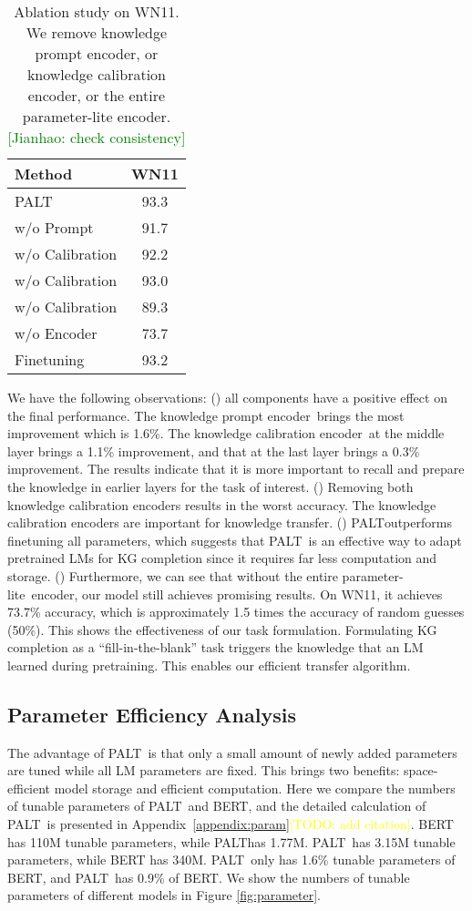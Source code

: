 \documentclass[11pt]{article}
\newcommand{\method}{\textsc{PALT}}
\newcommand{\methodLarge}{\method}
\newcommand{\prompt}{knowledge prompt encoder}
\newcommand{\calibration}{knowledge calibration encoder}
\newcommand{\pl}{parameter-lite}
\newcommand{\jianhao}[1]{\textcolor{green}{[Jianhao: #1]}}
\newcommand{\todo}[1]{\textcolor{yellow}{[TODO: #1]}}
\newcommand{\jianhao}[1]{}
\newcommand{\todo}[1]{}
\begin{document}
\begin{table}[!htb]
\centering
\resizebox{0.75\linewidth}{!}
  {
    \begin{tabular}{l|c}
       \toprule
   {\bf Method} & {\bf WN11}  \\ 
    \hline
    \method   & 93.3 \\
w/o Prompt & 91.7 \\
    w/o Calibration & 92.2 \\
    w/o Calibration  & 93.0 \\
    w/o Calibration & 89.3 \\
    w/o Encoder & 73.7 \\
\hdashline
    Finetuning & 93.2 \\
    \bottomrule
    \end{tabular}}
    \caption{Ablation study on WN11. We remove \prompt, or \calibration, or the entire parameter-lite encoder.\jianhao{check consistency}}
    \label{tab:ablation}
\end{table} 
We have the following observations: (\expandafter{}) all components have a positive effect on the final performance. The \prompt\ brings the most improvement which is 1.6\%. The \calibration\ at the middle layer brings a 1.1\% improvement, and that at the last layer brings a 0.3\% improvement. The results indicate that it is more important to recall and prepare the knowledge in earlier layers for the task of interest. (\expandafter{}) Removing both \calibration s results in the worst accuracy. The \calibration s are important for knowledge transfer. (\expandafter{}) \method  outperforms finetuning all parameters, which suggests that \method\ is an effective way to adapt pretrained LMs for KG completion since it requires far less computation and storage. (\expandafter{}) Furthermore, we can see that without the entire \pl\ encoder, our model still achieves promising results. On WN11, it achieves 73.7\% accuracy, which is approximately 1.5 times the accuracy of random guesses (50\%). This shows the effectiveness of our task formulation. Formulating KG completion as a ``fill-in-the-blank'' task triggers the knowledge that an LM learned during pretraining. This enables our efficient transfer algorithm.

\subsection{Parameter Efficiency Analysis}
The advantage of \method\ is that only a small amount of newly added parameters are tuned while all LM parameters are fixed. This brings two benefits: space-efficient model storage and efficient computation. Here we compare the numbers of tunable parameters of \method\ and BERT, and the detailed calculation of \method\ is presented in Appendix~\ref{appendix:param}\todo{add citation}. BERT has 110M tunable parameters, while \method  has 1.77M. \methodLarge\ has 3.15M tunable parameters, while BERT has 340M. \method\  only has 1.6\% tunable parameters of BERT, and \method\  has 0.9\% of BERT. We show the numbers of tunable parameters of different models in Figure \ref{fig:parameter}.
\end{document}
